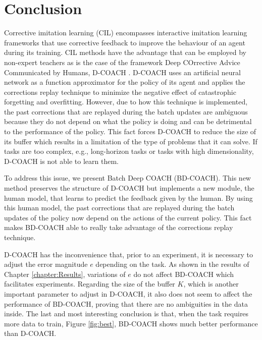 \chapter{Conclusion}
\label{chapter:conclusion}


Corrective imitation learning (CIL) encompasses interactive imitation learning frameworks that use corrective feedback to improve the behaviour of an agent during its training. CIL methods have the advantage that can be employed by non-expert teachers as is the case of the framework Deep COrrective Advice Communicated by Humans, D-COACH \cite{D-COACH-Dattari-Celemin-Ruiz-del-Solar-Kober:2018}. D-COACH uses an artificial neural network as a function approximator for the policy of its agent and applies the corrections replay technique to minimize the negative effect of catastrophic forgetting and overfitting. However, due to how this technique is implemented, the past corrections that are replayed during the batch updates are ambiguous because they do not depend on what the policy is doing and can be detrimental to the performance of the policy. This fact forces D-COACH to reduce the size of its buffer which results in a limitation of the type of problems that it can solve. If tasks are too complex, e.g., long-horizon tasks or tasks with high dimensionality, D-COACH is not able to learn them.


To address this issue, we present Batch Deep COACH (BD-COACH). This new method preserves the structure of D-COACH but implements a new module, the human model, that learns to predict the feedback given by the human. By using this human model, the past corrections that are replayed during the batch updates of the policy now depend on the actions of the current policy. This fact makes BD-COACH able to really take advantage of the corrections replay technique.


D-COACH has the inconvenience that, prior to an experiment, it is necessary to adjust the error magnitude $e$ depending on the task. As shown in the results of Chapter \ref{chapter:Results}, variations of $e$ do not affect BD-COACH which facilitates experiments. Regarding the size of the buffer $K$, which is another important parameter to adjust in D-COACH, it also does not seem to affect the performance of BD-COACH, proving that there are no ambiguities in the data inside. The last and most interesting conclusion is that, when the task requires more data to train, Figure \ref{fig:best}, BD-COACH shows much better performance than D-COACH.




